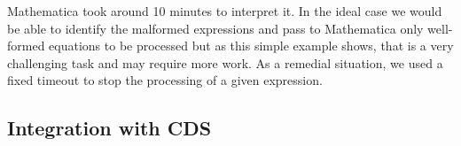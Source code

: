 Mathematica took around 10 minutes to interpret it.
In the ideal case we would be able to identify the malformed expressions and pass to Mathematica only well-formed equations to be processed but as this simple example shows, that is a very challenging task and may require more work.
As a remedial situation, we used a fixed timeout to stop the processing of a given expression.

\subsection{Integration with CDS}
